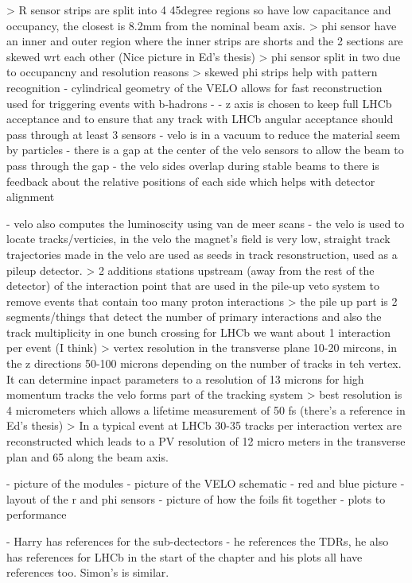 > R sensor strips are split into 4 45degree regions so have low capacitance and occupancy, the closest is 8.2mm from the nominal beam axis.
> phi sensor have an inner and outer region where the inner strips are shorts and the 2 sections are skewed wrt each other (Nice picture in Ed's thesis)
> phi sensor split in two due to occupancny and resolution reasons
> skewed phi strips help with pattern recognition
- cylindrical geometry of the VELO allows for fast reconstruction used for triggering events with b-hadrons
- - z axis is chosen to keep full LHCb acceptance and to ensure that any track with LHCb angular acceptance should pass through at least 3 sensors
- velo is in a vacuum to reduce the material seem by particles
- there is a gap at the center of the velo sensors to allow the beam to pass through the gap
- the velo sides overlap during stable beams to there is feedback about the relative positions of each side which helps with detector alignment

- velo also computes the luminoscity using van de meer scans
- the velo is used to locate tracks/verticies, in the velo the magnet's field is very low, straight track trajectories made in the velo are used as seeds in track resonstruction, used as a pileup detector.
> 2 additions stations upstream (away from the rest of the detector) of the interaction point that are used in the pile-up veto system to remove events that contain too many proton interactions
> the pile up part is 2 segments/things that detect the number of primary interactions and also the track multiplicity in one bunch crossing for LHCb we want about 1 interaction per event (I think)
> vertex resolution in the transverse plane 10-20 mircons, in the z directions 50-100 microns depending on the number of tracks in teh vertex. It can determine inpact parameters to a resolution of 13 microns for high momentum tracks
 the velo forms part of the tracking system
> best resolution is 4 micrometers which allows a lifetime measurement of 50 fs (there's a reference in Ed's thesis)
> In a typical event at LHCb 30-35 tracks per interaction vertex are reconstructed which leads to a PV resolution of 12 micro meters in the transverse plan and 65 along the beam axis.

- picture of the modules
- picture of the VELO schematic - red and blue picture
- layout of the r and phi sensors
- picture of how the foils fit together
- plots to performance

- Harry has references for the sub-dectectors - he references the TDRs, he also has references for LHCb in the start of the chapter and his plots all have references too. Simon's is similar.

